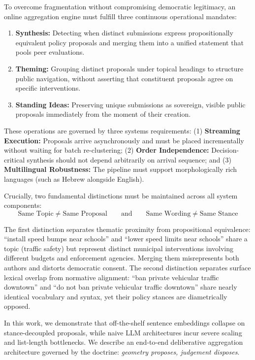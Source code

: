\documentclass[11pt,a4paper]{article}
\begin{document}
To overcome fragmentation without compromising democratic legitimacy, an online aggregation engine must fulfill three continuous operational mandates:

\begin{enumerate}
\item \textbf{Synthesis:} Detecting when distinct submissions express propositionally equivalent policy proposals and merging them into a unified statement that pools peer evaluations.
\item \textbf{Theming:} Grouping distinct proposals under topical headings to structure public navigation, without asserting that constituent proposals agree on specific interventions.
\item \textbf{Standing Ideas:} Preserving unique submissions as sovereign, visible public proposals immediately from the moment of their creation.
\end{enumerate}

These operations are governed by three systems requirements: (1) \textbf{Streaming Execution:} Proposals arrive asynchronously and must be placed incrementally without waiting for batch re-clustering; (2) \textbf{Order Independence:} Decision-critical synthesis should not depend arbitrarily on arrival sequence; and (3) \textbf{Multilingual Robustness:} The pipeline must support morphologically rich languages (such as Hebrew alongside English).

Crucially, two fundamental distinctions must be maintained across all system components:
\begin{equation}
\text{Same Topic} \neq \text{Same Proposal} \qquad \text{and} \qquad \text{Same Wording} \neq \text{Same Stance}
\end{equation}

The first distinction separates thematic proximity from propositional equivalence: ``install speed bumps near schools'' and ``lower speed limits near schools'' share a topic (traffic safety) but represent distinct municipal interventions involving different budgets and enforcement agencies. Merging them misrepresents both authors and distorts democratic consent. The second distinction separates surface lexical overlap from normative alignment: ``ban private vehicular traffic downtown'' and ``do not ban private vehicular traffic downtown'' share nearly identical vocabulary and syntax, yet their policy stances are diametrically opposed.

In this work, we demonstrate that off-the-shelf sentence embeddings collapse on stance-decoupled proposals, while naive LLM architectures incur severe scaling and list-length bottlenecks. We describe an end-to-end deliberative aggregation architecture governed by the doctrine: \emph{geometry proposes, judgement disposes}.
\end{document}
